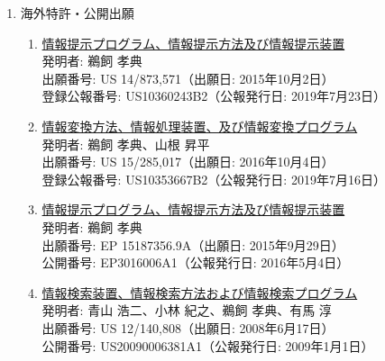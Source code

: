 \documentclass[dvipdfmx]{jlreq}
\begin{document}
\begin{enumerate}[label=\arabic*,align=parleft]
\begin{enumerate}
\item \href{https://jglobal.jst.go.jp/detail?JGLOBAL_ID=200903089723017439}{計算機システムにおける負荷分散方法及びそれを利用した計算機システム}\\発明者: 鵜飼 孝典、上田 晴康\\出願番号: 特願平6-167902（出願日: 1994年7月20日）\\公開番号: 特開平8-030558（公開日: 1996年2月2日）
\item \href{https://jglobal.jst.go.jp/detail?JGLOBAL_ID=200903062969094569}{ソフトウェアの開発過程記述支援方法および装置}\\発明者: 鵜飼 孝典\\出願番号: 特願平6-125035（出願日: 1994年6月7日）\\公開番号: 特開平7-334356（公開日: 1995年12月22日）
\item 振り返りデータ処理方法及び装置\\発明者: 鵜飼 孝典\\出願番号: 特願2006-204277（出願日: 2006年7月27日）\\\href{https://patents.google.com/patent/US20080027927A1/en}{関連する米国公開公報（US20080027927A1）}
\end{enumerate}
\item 海外特許・公開出願
\begin{enumerate}
\item \href{https://patents.google.com/patent/US10360243B2/en}{情報提示プログラム、情報提示方法及び情報提示装置}\\発明者: 鵜飼 孝典\\出願番号: US 14/873,571（出願日: 2015年10月2日）\\登録公報番号: US10360243B2（公報発行日: 2019年7月23日）
\item \href{https://patents.google.com/patent/US10353667B2/en}{情報変換方法、情報処理装置、及び情報変換プログラム}\\発明者: 鵜飼 孝典、山根 昇平\\出願番号: US 15/285,017（出願日: 2016年10月4日）\\登録公報番号: US10353667B2（公報発行日: 2019年7月16日）
\item \href{https://patents.google.com/patent/EP3016006A1/en}{情報提示プログラム、情報提示方法及び情報提示装置}\\発明者: 鵜飼 孝典\\出願番号: EP 15187356.9A（出願日: 2015年9月29日）\\公開番号: EP3016006A1（公報発行日: 2016年5月4日）
\item \href{https://patents.google.com/patent/US20090006381A1/en}{情報検索装置、情報検索方法および情報検索プログラム}\\発明者: 青山 浩二、小林 紀之、鵜飼 孝典、有馬 淳\\出願番号: US 12/140,808（出願日: 2008年6月17日）\\公開番号: US20090006381A1（公報発行日: 2009年1月1日）

\end{enumerate}
\end{enumerate}
\end{document}
